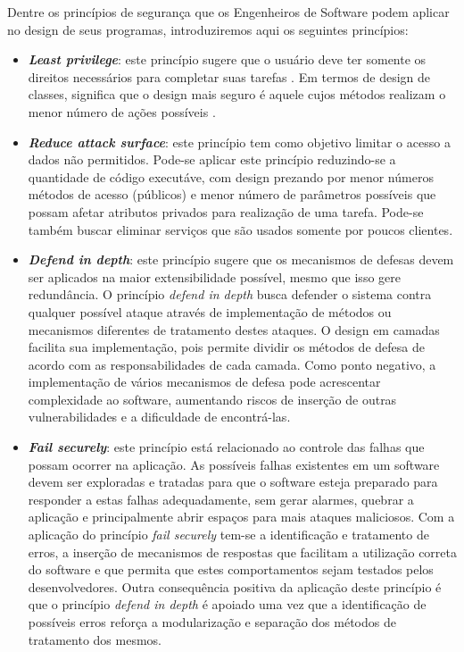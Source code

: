 %

Dentre os princípios de segurança que os Engenheiros de Software podem aplicar no design de seus programas, introduziremos aqui os seguintes princípios:

\begin{itemize}
\item \textbf{\emph{Least privilege}}: este princípio sugere que o usuário deve ter somente os direitos necessários para completar suas tarefas \cite{bishop2003}. Em termos de design de classes, significa que o design mais seguro é aquele cujos métodos realizam o menor número de ações possíveis \cite{a1lshammari2009}.
\item \textbf{\emph{Reduce attack surface}}: este princípio tem como objetivo limitar o acesso a dados não permitidos. Pode-se aplicar este princípio reduzindo-se a quantidade de código executáve, com design prezando por menor números métodos de acesso (públicos) e menor número de parâmetros possíveis que possam afetar atributos privados para realização de uma tarefa. Pode-se também buscar eliminar serviços que são usados somente por poucos clientes.
\item \textbf{\emph{Defend in depth}}: este princípio sugere que os mecanismos de defesas devem ser aplicados na maior extensibilidade possível, mesmo que isso gere redundância. O princípio \emph{defend in depth} busca defender o sistema contra qualquer possível ataque através de implementação de métodos ou mecanismos diferentes de tratamento destes ataques. O design em camadas facilita sua implementação, pois permite dividir os métodos de defesa de acordo com as responsabilidades de cada camada. Como ponto negativo, a implementação de vários mecanismos de defesa pode acrescentar complexidade ao software, aumentando riscos de inserção de outras vulnerabilidades e a dificuldade de encontrá-las.
\item \textbf{\emph{Fail securely}}: este princípio está relacionado ao controle das falhas que possam ocorrer na aplicação. As possíveis falhas existentes em um software devem ser exploradas e tratadas para que o software esteja preparado para responder a estas falhas adequadamente, sem gerar alarmes, quebrar a aplicação e principalmente abrir espaços para mais ataques maliciosos. Com a aplicação do princípio \emph{fail securely} tem-se a identificação e tratamento de erros, a inserção de mecanismos de respostas que facilitam a utilização correta do software e que permita que estes comportamentos sejam testados pelos desenvolvedores. Outra consequência positiva da aplicação deste princípio é que o princípio \emph{defend in depth} é apoiado uma vez que a identificação de possíveis erros reforça a modularização e separação dos métodos de tratamento dos mesmos.

\end{itemize}

